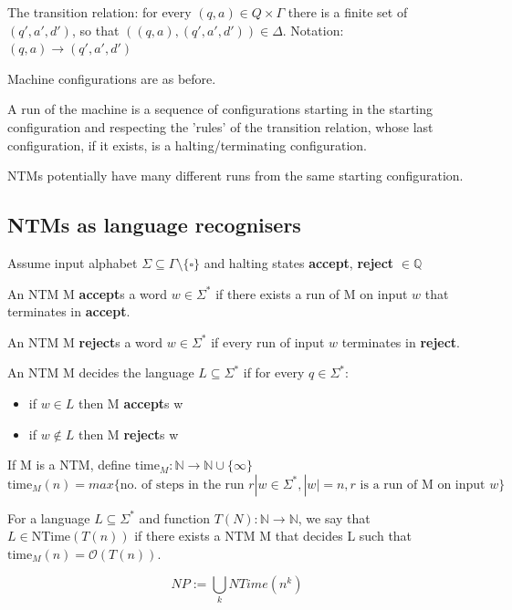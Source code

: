\documentclass[a4paper,12pt]{article}
\theoremstyle{definition}
\theoremstyle{remark}
\newcommand{\N}{\mathbb{N}}
\newcommand{\Q}{\mathbb{Q}}
\begin{document}
The transition relation: for every $(q, a) \in Q \times \Gamma$ there is a finite set of $(q', a', d')$, so that
$((q, a), (q', a', d')) \in \Delta$. Notation: $(q, a) \to (q', a', d')$

Machine configurations are as before.

A run of the machine is a sequence of configurations starting in the starting configuration and respecting the 'rules' of the 
transition relation, whose last configuration, if it exists, is a halting/terminating configuration.

NTMs potentially have many different runs from the same starting configuration.


\subsection{NTMs as language recognisers}

Assume input alphabet $\Sigma \subseteq \Gamma \setminus \{\square\}$ and halting states \textbf{accept}, \textbf{reject} $\in \Q$

An NTM M \textbf{accept}s a word $w \in \Sigma^*$ if there exists a run of M on input $w$ that terminates in \textbf{accept}.

An NTM M \textbf{reject}s a word $w \in \Sigma^*$ if every run of input $w$ terminates in \textbf{reject}.

An NTM M decides the language $L \subseteq \Sigma^*$ if for every $q \in \Sigma^*$:
\begin{itemize}
    \item if $w \in L$ then M \textbf{accept}s w
    \item if $w \notin L$ then M \textbf{reject}s w
\end{itemize}


If M is a NTM, define $\text{time}_M: \N \to \N \cup \{\infty\}$
\begin{dmath*}
    \text{time}_M(n) = max \{\text{no. of steps in the run } r | w \in \Sigma^*, |w| = n, r \text{ is a run of M on input } w\}
\end{dmath*}

For a language $L \subseteq \Sigma^*$ and function $T(N): \N \to \N$, we say that $L \in \text{NTime}(T(n))$ if there exists a NTM M
that decides L such that $\text{time}_M(n) = \mathscr{O}(T(n))$.

\begin{equation*}
    NP := \bigcup\limits_{k} NTime(n^k)
\end{equation*}
\end{document}

